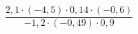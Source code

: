 \begin{ex}[type=calculate]
	\begin{condition}
		\( \dfrac{2,1\cdot(-4,5)\cdot0,14\cdot(-0,6)}{-1,2\cdot(-0,49)\cdot0,9} \)
	\end{condition}
	\answer{}
\end{ex}